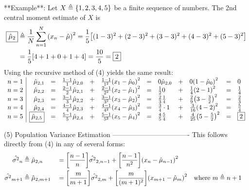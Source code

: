**Example**:
Let $X \triangleq \left\{1,2,3,4,5\right\}$ be a finite sequence of numbers.
The 2nd central moment estimate of $X$ is
\begin{align*}
  \boxed{\hat{\mu}_2} &\triangleq \frac{1}{N}\sum_{n=1}^N {\left(x_n -\hat{\mu}\right)}^2
                     =    \frac{1}{5}{\left[ (1-3)^2 + (2-3)^2 + (3-3)^2 + (4-3)^2 + (5-3)^2 \right]}
                  \\&=    \frac{1}{5}{\left[ 4 + 1 + 0 + 1 + 4 \right]}
                     =    \frac{10}{5}
                     =    \boxed{2}
\end{align*}
Using the recursive method of (4) yields the same result:  
$\begin{array}{l|rclcl clcl clcl cl}
  n=1 & \hat{\mu}_{2,1} &=& \frac{1-1}{1}\hat{\mu}_{2,0} &+& \frac{1-1}{1^2}{\left( x_1 - \hat{\mu}_0  \right)}^2
                       &=& 0            \hat{\mu}_{2,0} &+& 0              {\left( 1      - \hat{\mu}_0  \right)}^2
                       &=& 0\\
  n=2 & \hat{\mu}_{2,2} &=& \frac{2-1}{2}\hat{\mu}_{2,1} &+& \frac{2-1}{2^2}{\left( x_2 - \hat{\mu}_1  \right)}^2
                       &=& \frac{1}{2}  0              &+& \frac{1}{4}    {\left( 2      - 1           \right)}^2
                       &=& \frac{1}{4}\\
  n=3 & \hat{\mu}_{2,3} &=& \frac{3-1}{3}\hat{\mu}_{2,2} &+& \frac{3-1}{3^2}{\left( x_3 - \hat{\mu}_2  \right)}^2
                       &=& \frac{2}{3}  \frac{1}{4}    &+& \frac{2}{9}    {\left( 3      - \frac{3}{2} \right)}^2
                       &=& \frac{2}{3}\\
  n=4 & \hat{\mu}_{2,4} &=& \frac{4-1}{4}\hat{\mu}_{2,3} &+& \frac{4-1}{4^2}{\left( x_4 - \hat{\mu}_3  \right)}^2
                       &=& \frac{3}{4}  \cdot 1        &+& \frac{3}{16}   {\left( 4      - 2           \right)}^2
                       &=& \frac{5}{4}\\
  n=5 & \boxed{\hat{\mu}_{2,5}} &=& \frac{5-1}{5}\hat{\mu}_{2,4} &+& \frac{5-1}{5^2}{\left( x_5 - \hat{\mu}_4  \right)}^2
                       &=& \frac{4}{5}  \frac{5}{4}    &+& \frac{4}{25}   {\left( 5      - \frac{5}{2} \right)}^2
                       &=& \boxed{2}
\end{array}$

(5) Population Variance Estimation
----------------------------------
This follows directly from (4) in any of several forms:
\begin{align*}
  \hat{\sigma^2}_n
    &\triangleq \hat{\mu}_{2,n}
   &&= {\left[\frac{n-1}{n}\right]}\hat{\sigma^2}_{2,n-1} + {\left[ \frac{n-1}{n^2} \right]} {\left( x_n - \hat{\mu}_{n-1} \right)}^2
   \\
  \hat{\sigma^2}_{m+1}
    &\triangleq \hat{\mu}_{2,m+1}
   &&= {\left[\frac{m}{m+1}\right]}\hat{\sigma^2}_{2,m} + {\left[ \frac{m}{(m+1)^2} \right]} {\left( x_{m+1} - \hat{\mu}_{m} \right)}^2
   &&  \text{where $m\triangleq n+1$}
\end{align*}